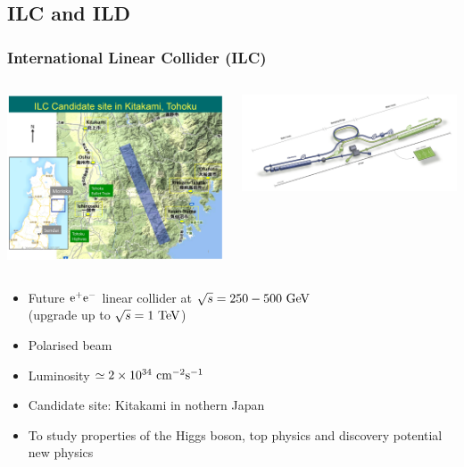 \documentclass{beamer}
\begin{document}
    
    \subsection{ILC and ILD}

  \begin{frame}
    \frametitle{International Linear Collider (ILC)}

    \vspace{-0.3cm}
    \begin{columns}[c]
      \begin{column}{3cm}
        \centering
        \includegraphics[width = 4 cm]{Pictures/ILC-Candidate-Area2.jpg}
      \end{column}
      \begin{column}{8cm}
        \centering
        \includegraphics[width = 9 cm]{Pictures/ILC.png}
      \end{column}
    \end{columns}

    \vspace{-0.3cm}
    \begin{itemize}
      \item Future $\rm{e}^+\rm{e}^-$ linear collider at $\sqrt{s} = 250 - 500~\rm{GeV}$ \\ (upgrade up to $\sqrt{s} = 1~\rm{TeV}$)
      \item Polarised beam
      \item Luminosity $\simeq 2 \times 10^{34}~\rm{cm}^{-2}\rm{s}^{-1}$
      \item Candidate site: Kitakami in nothern Japan
      \item To study properties of the Higgs boson, top physics and discovery potential new physics
    \end{itemize}
  \end{frame}
 
\end{document}
